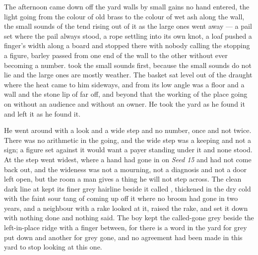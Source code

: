 The afternoon came down off the yard walls by small gains no hand entered, the light going from the colour of old brass to the colour of wet ash along the wall, the small sounds of the tend rising out of it as the large ones went away --- a pail set where the pail always stood, a rope settling into its own knot, a loaf pushed a finger's width along a board and stopped there with nobody calling the stopping a figure, barley passed from one end of the wall to the other without ever becoming a number.  took the small sounds first, because the small sounds do not lie and the large ones are mostly weather. The basket sat level out of the draught where the heat came to him sideways, and from its low angle  was a floor and a wall and the stone lip of  far off, and beyond that the working of the place going on without an audience and without an owner. He took the yard as he found it and left it as he found it.

He went around  with a look and a wide step and no number, once and not twice. There was no arithmetic in the going, and the wide step was a keeping and not a sign; a figure set against it would want a payer standing under it and none stood. At  the step went widest, where a hand had gone in on \emph{Seed 15} and had not come back out, and the wideness was not a mourning, not a diagnosis and not a door left open, but the room a man gives a thing he will not step across. The clean dark line at  kept its finer grey hairline beside it called , thickened in the dry cold with the faint sour tang of  coming up off it where no broom had gone in two years, and a neighbour with a rake looked at it, raised the rake, and set it down with nothing done and nothing said. The boy kept the called-gone grey beside the left-in-place ridge with a finger between, for there is a word in the yard for grey put down and another for grey gone, and no agreement had been made in this yard to stop looking at this one.

